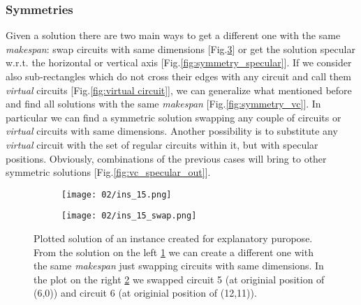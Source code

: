     \subsubsection{Symmetries} \label{sec:symmetries}

        Given a solution there are two main ways to get a different one with the same \textit{makespan}:
        swap circuits with same dimensions [Fig.\ref{fig:symmetry_swap}] or get the solution specular w.r.t. the horizontal 
        or vertical axis [Fig.\ref{fig:symmetry_specular}].
        If we consider also sub-rectangles which do not cross their edges with any circuit and call them 
        \textit{virtual} circuits [Fig.\ref{fig:virtual circuit}], we can generalize what mentioned before and find all solutions with 
        the same \textit{makespan} [Fig.\ref{fig:symmetry_vc}].
        In particular we can find a symmetric solution swapping any couple of circuits or \textit{virtual} circuits 
        with same dimensions. Another possibility is to substitute any \textit{virtual} circuit with the set of regular circuits within it, 
        but with specular positions. Obviously, combinations of the previous cases will bring to other symmetric 
        solutions [Fig.\ref{fig:vc_specular_out}].

        \begin{figure}[H]
            \centering
            \begin{subfigure}[b]{0.45\textwidth}
                \centering 
                \texttt{[image: 02/ins\_15.png]}
                \caption{}
                \label{fig:ins_15_mod}
            \end{subfigure}
            \hfill
            \begin{subfigure}[b]{0.45\textwidth}
                \centering
                \texttt{[image: 02/ins\_15\_swap.png]}
                \caption{}
                \label{fig:ins_15_swap}
            \end{subfigure}
            \hfill
            \caption{
                Plotted solution of an instance created for explanatory puropose.
                From the solution on the left \ref{fig:ins_15_mod} we can create a different one
                with the same \textit{makespan} just swapping circuits with same dimensions. In
                the plot on the right \ref{fig:ins_15_swap} we swapped circuit 5 (at originial
                position of (6,0)) and circuit 6 (at originial position of (12,11)).
            }
            \label{fig:symmetry_swap}
        \end{figure}
       
